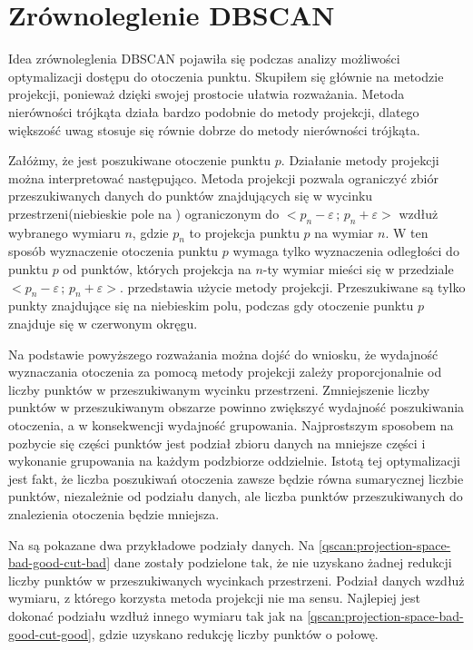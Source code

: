 \section{Zrównoleglenie DBSCAN}
Idea zrównoleglenia DBSCAN pojawiła się podczas analizy możliwości optymalizacji dostępu do otoczenia punktu. Skupiłem się głównie na metodzie projekcji, ponieważ dzięki swojej prostocie ułatwia rozważania. Metoda nierówności trójkąta działa bardzo podobnie do metody projekcji, dlatego większość uwag stosuje się równie dobrze do metody nierówności trójkąta.\par
Załóżmy, że jest poszukiwane otoczenie punktu $ p $. Działanie metody projekcji można interpretować następująco. Metoda projekcji pozwala ograniczyć zbiór przeszukiwanych danych do punktów znajdujących się w wycinku przestrzeni(niebieskie pole na ) ograniczonym do $ <p_n-\varepsilon\,;\,p_n+\varepsilon> $ wzdłuż wybranego wymiaru $ n $, gdzie $ p_n $ to projekcja punktu $ p $ na wymiar $ n $. W ten sposób wyznaczenie otoczenia punktu $ p $ wymaga tylko wyznaczenia odległości do punktu $ p $ od punktów, których projekcja na $ n $-ty wymiar mieści się w przedziale $ <p_n-\varepsilon\,;\,p_n+\varepsilon> $.  przedstawia użycie metody projekcji. Przeszukiwane są tylko punkty znajdujące się na niebieskim polu, podczas gdy otoczenie punktu $ p $ znajduje się w czerwonym okręgu.\par

Na podstawie powyższego rozważania można dojść do wniosku, że wydajność wyznaczania otoczenia za pomocą metody projekcji zależy proporcjonalnie od liczby punktów w przeszukiwanym wycinku przestrzeni. Zmniejszenie liczby punktów w przeszukiwanym obszarze powinno zwiększyć wydajność poszukiwania otoczenia, a w konsekwencji wydajność grupowania. Najprostszym sposobem na pozbycie się części punktów jest podział zbioru danych na mniejsze części i wykonanie grupowania na każdym podzbiorze oddzielnie. Istotą tej optymalizacji jest fakt, że liczba poszukiwań otoczenia zawsze będzie równa sumarycznej liczbie punktów, niezależnie od podziału danych, ale liczba punktów przeszukiwanych do znalezienia otoczenia będzie mniejsza.\par

Na  są pokazane dwa przykładowe podziały danych. Na \ref{qscan:projection-space-bad-good-cut-bad} dane zostały podzielone tak, że nie uzyskano żadnej redukcji liczby punktów w przeszukiwanych wycinkach przestrzeni. Podział danych wzdłuż wymiaru, z którego korzysta metoda projekcji nie ma sensu. Najlepiej jest dokonać podziału wzdłuż innego wymiaru tak jak na \ref{qscan:projection-space-bad-good-cut-good}, gdzie uzyskano redukcję liczby punktów o połowę.\par
